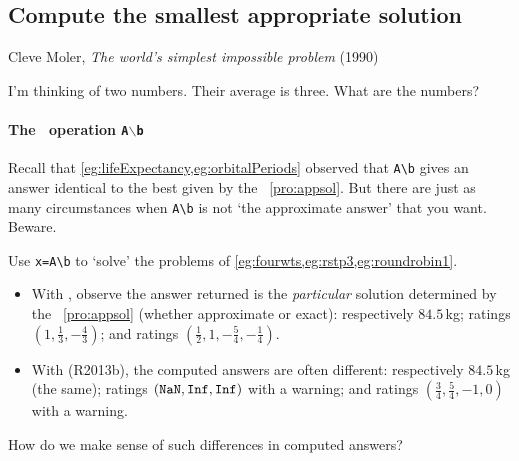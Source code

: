 \begin{comment}
\nakos{\S8.9} has some useful applications to USA NRL rating of quarterbacks---using data from \emph{The Sports Illustrated 19xx Sports Almanac}.
\end{comment}




\subsection{Compute the smallest appropriate solution}
\label{sec:csap}

\begin{quoted}{\parbox[t]{0.5\linewidth}{Cleve Moler, \emph{The world's simplest impossible problem} (1990)}}
I'm thinking of two numbers.  Their average is three.  What are the numbers?
\end{quoted}

\begin{comment}
Chapter~20 of the book by \cite{Higham1996} has some aspects of this section (including pseudo-inverse).
Matlab and Octave currently differ in that octave returns the smallest solution, but matlab returns a solution with at least \(m\)~nonzero elements??
\end{comment}

\paragraph{The \script\ operation \texttt{A$\backslash$b}}
Recall that \cref{eg:lifeExpectancy,eg:orbitalPeriods} observed that \verb|A\b| gives an answer identical to the best  given by the \svd\ \autoref{pro:appsol}.
But there are just as many circumstances when \verb|A\b| is not `the approximate answer' that you want.
Beware.


\begin{example} 
Use \verb|x=A\b| to `solve' the problems of \cref{eg:fourwts,eg:rstp3,eg:roundrobin1}.
\begin{itemize}
\item With \script[2], observe the answer returned is the \emph{particular} solution determined by the \svd\ \autoref{pro:appsol} (whether approximate or exact): 
respectively \(84.5\)\,kg; 
ratings \((1,\frac13,-\frac43)\); and 
ratings \((\frac12,1,-\frac54,-\frac14)\). %
\item With \script[1] (R2013b), the computed answers are often different: 
respectively \(84.5\)\,kg (the same); 
ratings \((\verb|NaN|,\verb|Inf|,\verb|Inf|)\) with a warning; 
and ratings \((\tfrac34,\tfrac54,-1,0)\) with a warning. %
\end{itemize}
How do we make sense of such differences in computed answers?
\end{example}

